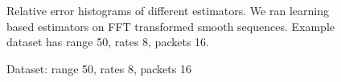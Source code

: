 \begin{figure}[htpb]
{   }
   \quad
   \caption{Relative error histograms of different estimators. We ran learning
      based estimators on FFT transformed smooth sequences. Example dataset has
      range 50, rates 8, packets 16.}
   \label{fig:name}
\end{figure}

\begin{figure}[htpb]
   \centering
   \quad
   \caption{Dataset: range 50, rates 8, packets 16}
   \label{fig:exp4}
\end{figure}

